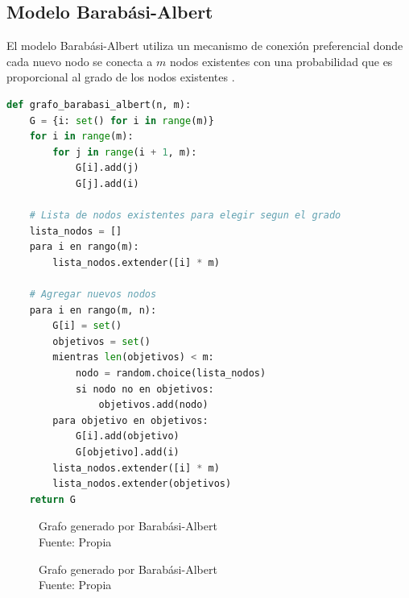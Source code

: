 \subsection{Modelo Barabási-Albert}

El modelo Barabási-Albert utiliza un mecanismo de conexión preferencial donde cada nuevo nodo se conecta a \( m \) nodos existentes con una probabilidad que es proporcional al grado de los nodos existentes \citep{Barabasi1999} .

\begin{lstlisting}[language=Python]
def grafo_barabasi_albert(n, m):
    G = {i: set() for i in range(m)}
    for i in range(m):
        for j in range(i + 1, m):
            G[i].add(j)
            G[j].add(i)

    # Lista de nodos existentes para elegir segun el grado
    lista_nodos = []
    para i en rango(m):
        lista_nodos.extender([i] * m)

    # Agregar nuevos nodos
    para i en rango(m, n):
        G[i] = set()
        objetivos = set()
        mientras len(objetivos) < m:
            nodo = random.choice(lista_nodos)
            si nodo no en objetivos:
                objetivos.add(nodo)
        para objetivo en objetivos:
            G[i].add(objetivo)
            G[objetivo].add(i)
        lista_nodos.extender([i] * m)
        lista_nodos.extender(objetivos)
    return G
\end{lstlisting}

\begin{figure}[h]
\caption{Grafo generado por Barabási-Albert\\Fuente: Propia}
\end{figure}
\newpage

\begin{figure}[h]
\caption{Grafo generado por Barabási-Albert\\Fuente: Propia}
\end{figure}


